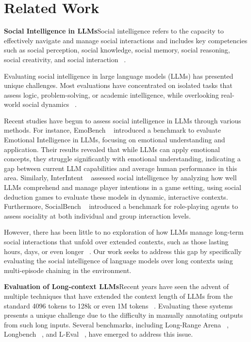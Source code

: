 \section{Related Work}
\label{sec:related_work}

\textbf{Social Intelligence in LLMs}\quad Social intelligence refers to the capacity to effectively navigate and manage social interactions and includes key competencies such as social perception, social knowledge, social memory, social reasoning, social creativity, and social interaction ~\citep{mathur2024advancingsocialintelligenceai}.

Evaluating social intelligence in large language models (LLMs) has presented unique challenges. Most evaluations have concentrated on isolated tasks that assess logic, problem-solving, or academic intelligence, while overlooking real-world social dynamics ~\citep{xu2024academicallyintelligentllmsnecessarily}.

Recent studies have begun to assess social intelligence in LLMs through various methods. For instance, EmoBench ~\citep{sabour2024emobenchevaluatingemotionalintelligence} introduced a benchmark to evaluate Emotional Intelligence in LLMs, focusing on emotional understanding and application. Their results revealed that while LLMs can apply emotional concepts, they struggle significantly with emotional understanding, indicating a gap between current LLM capabilities and average human performance in this area. Similarly, InterIntent ~\citep{liu2024interintentinvestigatingsocialintelligence} assessed social intelligence by analyzing how well LLMs comprehend and manage player intentions in a game setting, using social deduction games to evaluate these models in dynamic, interactive contexts. Furthermore, SocialBench ~\citep{chen2024socialbenchsocialityevaluationroleplaying} introduced a benchmark for role-playing agents to assess sociality at both individual and group interaction levels.

However, there has been little to no exploration of how LLMs manage long-term social interactions that unfold over extended contexts, such as those lasting hours, days, or even longer ~\citep{mathur2024advancingsocialintelligenceai}. Our work seeks to address this gap by specifically evaluating the social intelligence of language models over long contexts using multi-episode chaining in the \sotopia environment.

\textbf{Evaluation of Long-context LLMs}\quad Recent years have seen the advent of multiple techniques that have extended the context length of LLMs from the standard 4096 tokens to 128k or even 1M tokens ~\citep{dao2022flashattentionfastmemoryefficientexact, lou2024sparserfastermoreefficient, xiao2024efficientstreaminglanguagemodels, liu2024worldmodelmillionlengthvideo}. Evaluating these systems presents a unique challenge due to the difficulty in manually annotating outputs from such long inputs. Several benchmarks, including Long-Range Arena ~\citep{tay2020longrangearenabenchmark}, Longbench ~\citep{bai2023longbench}, and L-Eval ~\citep{an2023levalinstitutingstandardizedevaluation}, have emerged to address this issue.

